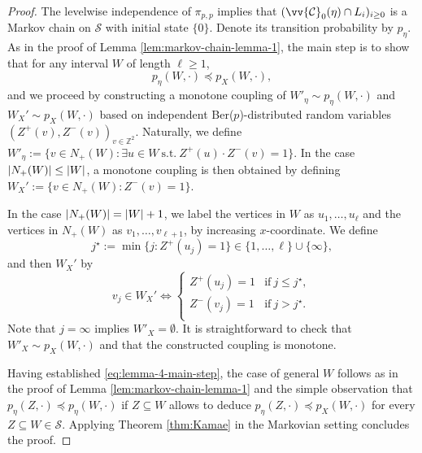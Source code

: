 \documentclass[11pt]{article}
\newcommand{\Z}{\mathbb{Z}}
\DeclarePairedDelimiter{\abs}{\lvert}{\rvert}
\theoremstyle{remark}
\begin{document}
\begin{proof}
	The levelwise independence of $\pi_{p,p}$ implies that $(\vv{\mathcal C}_0(\eta) \cap L_i)_{i\ge 0}$ is a Markov chain on $\mathcal S$ with initial state $\{0\}$. Denote its transition probability by $p_\eta$. As in the proof of Lemma \ref{lem:markov-chain-lemma-1}, the main step is to show that for any interval $W$ of length $\ell \ge 1$,
	\begin{equation}\label{eq:lemma-4-main-step}
		p_\eta(W,\boldsymbol{\cdot}) \preceq p_X(W,\boldsymbol{\cdot}),
	\end{equation}
	and we proceed by constructing a monotone coupling of $W'_\eta \sim p_\eta(W,\boldsymbol{\cdot})$ and $W_X' \sim p_X(W,\boldsymbol{\cdot})$ based on  independent Ber($p$)-distributed random variables $(Z^+(v),Z^-(v))_{v \in \Z^2}$. Naturally, we  define $W'_\eta := \{v \in N_+(W): \exists u \in W\ \text{s.t.}\ Z^+(u)\cdot Z^-(v)=1\}$. In the case $\abs{N_+(W)} \le \abs{W}$, a monotone coupling is then obtained by defining $W_X':= \{v \in N_+(W) : Z^-(v)=1\}$. 
	
	In the case $\abs{N_+(W)} = \abs{W}+1$, we label the vertices in $W$ as $u_1,\ldots,u_\ell$ and the vertices in $N_+(W)$ as $v_1,\ldots,v_{\ell+1}$, by increasing $x$-coordinate. We define
	\begin{equation}
		j^\star := \min\{j: Z^+(u_j) = 1\} \in \{1,\ldots,\ell\} \cup \{\infty\}, 
	\end{equation}
	and then $W_X'$ by 
	\begin{equation}
		v_j \in W_X' \iff \begin{cases} Z^+(u_j) = 1 &\text{if}\ j \le j^\star, \\
			Z^-(v_j) = 1 &\text{if}\ j > j^\star. \\
		\end{cases} 
	\end{equation}
	Note that $j = \infty$ implies $W'_X = \emptyset$. It is straightforward to check that $W'_X \sim p_X(W,\boldsymbol{\cdot})$ and that the constructed coupling is monotone. 
	
	Having established \eqref{eq:lemma-4-main-step}, the case of general $W$ follows as in the proof of Lemma \ref{lem:markov-chain-lemma-1} and the simple observation that $p_\eta(Z,\boldsymbol{\cdot}) \preceq p_\eta(W,\boldsymbol{\cdot})$ if $Z \subseteq W$ allows to deduce  $p_\eta(Z,\boldsymbol{\cdot}) \preceq p_X(W,\boldsymbol{\cdot})$ for every $Z \subseteq W \in \mathcal S$.  Applying Theorem \ref{thm:Kamae} in the Markovian setting concludes the proof.
\end{proof}
\end{document}
